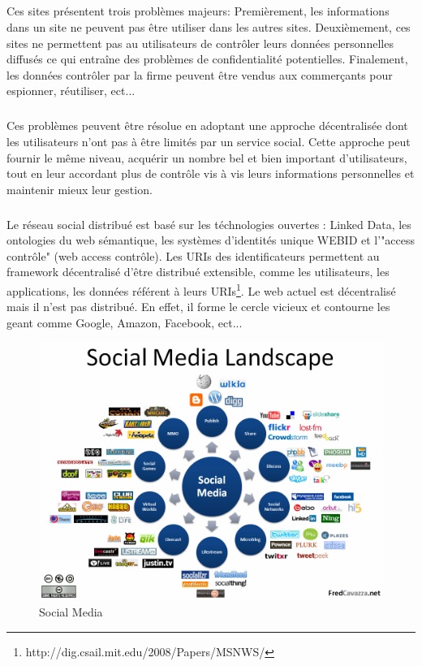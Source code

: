 \subparagraph{}
Ces sites présentent trois problèmes majeurs:\newline
Premièrement, les informations dans un site ne peuvent pas être utiliser dans les autres sites.\newline
Deuxièmement, ces sites ne permettent pas au utilisateurs de contrôler leurs données personnelles diffusés ce qui entraîne des problèmes de confidentialité potentielles.\newline
Finalement, les données contrôler par la firme peuvent être vendus aux commerçants pour espionner, réutiliser, ect... 
\subparagraph{}
Ces problèmes peuvent être résolue en adoptant une approche décentralisée dont les utilisateurs n'ont pas à être limités par un service social.
Cette approche peut fournir le même niveau, acquérir un nombre bel et bien important d'utilisateurs, tout en leur accordant plus de contrôle vis à vis leurs informations personnelles et maintenir mieux leur gestion.
\subparagraph{}
Le réseau social distribué est basé sur les téchnologies ouvertes : Linked Data, les ontologies du web sémantique, les systèmes d'identités unique WEBID et l'"access contrôle" (web access contrôle).
Les URIs des identificateurs permettent au framework décentralisé d'être distribué extensible, comme les utilisateurs, les applications, les données référent à leurs URIs\footnote{http://dig.csail.mit.edu/2008/Papers/MSNWS/}.
Le web actuel est décentralisé mais il n'est pas distribué. En effet, il forme le cercle vicieux et contourne les geant comme Google, Amazon, Facebook, ect...
\begin{figure}
                \centering
                \includegraphics[width=\textwidth]{Social-Media-Landscape.png}
                \caption{Social Media}
                \label{fig:Social Media}      
\end{figure}

